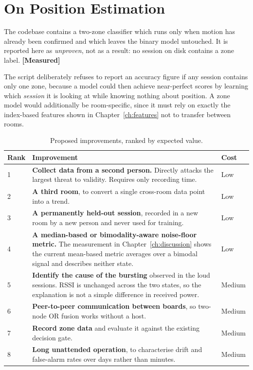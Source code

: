 \documentclass[11pt,a4paper,oneside]{report}
\newcommand{\evidencetag}[2]{{\small\sffamily\bfseries\textcolor{#1}{[#2]}}}
\newcommand{\Meas}{\evidencetag{accent}{Measured}}
\begin{document}
\section{On Position Estimation}

The codebase contains a two-zone classifier which runs only when motion has
already been confirmed and which leaves the binary model untouched. It is
reported here as \emph{unproven}, not as a result: no session on disk contains
a zone label. \Meas

The script deliberately refuses to report an accuracy figure if any session
contains only one zone, because a model could then achieve near-perfect scores
by learning which \emph{session} it is looking at while knowing nothing about
position. A zone model would additionally be room-specific, since it must rely
on exactly the index-based features shown in Chapter~\ref{ch:features} not to
transfer between rooms.


\label{ch:improve}

\begin{table}[H]
\centering
\caption{Proposed improvements, ranked by expected value.}
\label{tab:improve}
\renewcommand{\arraystretch}{1.25}
\begin{tabularx}{\linewidth}{|l|X|l|}
\hline
\textbf{Rank} & \textbf{Improvement} & \textbf{Cost} \\
\hline
1 &
\textbf{Collect data from a second person.} Directly attacks the largest
threat to validity. Requires only recording time. &
Low \\
\hline
2 &
\textbf{A third room}, to convert a single cross-room data point into a
trend. &
Low \\
\hline
3 &
\textbf{A permanently held-out session}, recorded in a new room by a new
person and never used for training. &
Low \\
\hline
4 &
\textbf{A median-based or bimodality-aware noise-floor metric.} The
measurement in Chapter~\ref{ch:discussion} shows the current mean-based
metric averages over a bimodal signal and describes neither state. &
Low \\
\hline
5 &
\textbf{Identify the cause of the bursting} observed in the loud sessions.
RSSI is unchanged across the two states, so the explanation is not a simple
difference in received power. &
Medium \\
\hline
6 &
\textbf{Peer-to-peer communication between boards}, so two-node OR fusion
works without a host. &
Medium \\
\hline
7 &
\textbf{Record zone data} and evaluate it against the existing decision
gate. &
Medium \\
\hline
8 &
\textbf{Long unattended operation}, to characterise drift and false-alarm
rates over days rather than minutes. &
Medium \\
\hline
\end{tabularx}
\end{table}
\end{document}
